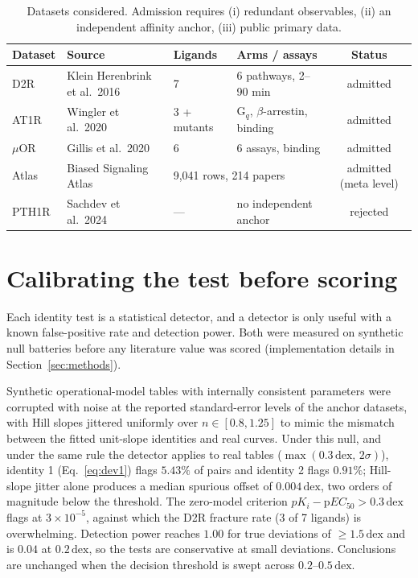 ﻿\documentclass[11pt,a4paper]{article}
\newcommand{\dex}{\ensuremath{\,\mathrm{dex}}}
\newcommand{\pKi}{\ensuremath{p\!K_{i}}}
\begin{document}
\begin{table}[!htbp]
\centering
\caption{Datasets considered. Admission requires (i) redundant observables, (ii) an independent affinity anchor, (iii) public primary data.}
\label{tab:datasets}
\footnotesize
\begin{tabular}{@{}llllc@{}}
\toprule
Dataset & Source & Ligands & Arms / assays & Status \\
\midrule
D2R & Klein Herenbrink et al.\ 2016 \cite{KleinHerenbrink2016} & 7 & 6 pathways, 2--90 min & admitted \\
AT1R & Wingler et al.\ 2020 \cite{Wingler2020} & 3 + mutants & G$_q$, $\beta$-arrestin, binding & admitted \\
$\mu$OR & Gillis et al.\ 2020 \cite{Gillis2020} & 6 & 6 assays, binding & admitted \\
Atlas & Biased Signaling Atlas \cite{BSA} & \multicolumn{2}{l}{9,041 rows, 214 papers} & admitted (meta level) \\
PTH1R & Sachdev et al.\ 2024 \cite{Sachdev2024} & --- & no independent anchor & rejected \\
\bottomrule
\end{tabular}
\end{table}

\section{Calibrating the test before scoring}
\label{sec:calibration}

Each identity test is a statistical detector, and a detector is only useful with a known false-positive rate and detection power. Both were measured on synthetic null batteries before any literature value was scored (implementation details in Section~\ref{sec:methods}).

Synthetic operational-model tables with internally consistent parameters were corrupted with noise at the reported standard-error levels of the anchor datasets, with Hill slopes jittered uniformly over $n\in[0.8,1.25]$ to mimic the mismatch between the fitted unit-slope identities and real curves. Under this null, and under the same rule the detector applies to real tables ($\max(0.3\dex,\,2\sigma)$), identity 1 (Eq.~\eqref{eq:dev1}) flags $5.43\%$ of pairs and identity 2 flags $0.91\%$; Hill-slope jitter alone produces a median spurious offset of $0.004\dex$, two orders of magnitude below the threshold. The zero-model criterion $\pKi-\mathrm{p}EC_{50}>0.3\dex$ flags at $3\times10^{-5}$, against which the D2R fracture rate (3 of 7 ligands) is overwhelming. Detection power reaches $1.00$ for true deviations of $\geq1.5\dex$ and is $0.04$ at $0.2\dex$, so the tests are conservative at small deviations. Conclusions are unchanged when the decision threshold is swept across $0.2$--$0.5\dex$.
\end{document}

